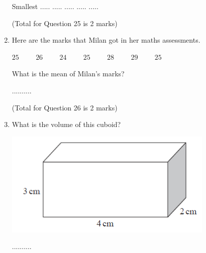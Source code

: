 \documentclass{article}
\begin{document}
\begin{enumerate}
\begin{center}
Smallest \quad ..... \hspace{2cm} ..... \hspace{2cm} ..... \hspace{2cm} ..... \hspace{2cm} ..... 

\end{center}

 \hfill\raggedright (Total for Question 25 is 2 marks) 
\vspace{5pt}
\hline
\vspace{7pt}

\item \quad Here are the marks that Milan got in her maths assessments.
\begin{center}
\( \displaystyle 25 \hspace{1cm} 26 \hspace{1cm} 24 \hspace{1cm} 25 \hspace{1cm} 28 \hspace{1cm} 29 \hspace{1cm} 25 \)  \\ 
\end{center}
\quad What is the mean of Milan’s marks?

\vspace{120pt}
\hspace{15cm} .......... 
\vspace{5pt}

\hfill\raggedright (Total for Question 26 is 2 marks) 
\vspace{5pt}
\hline
\vspace{7pt}

\item \quad What is the volume of this cuboid? \\ 
\vspace{5pt}

    \includegraphics[width=10cm]{Exams/Volume_1.png}

\vspace{20}
\hspace{15cm} ..........  
\vspace{5pt}


\end{enumerate}
\end{document}
